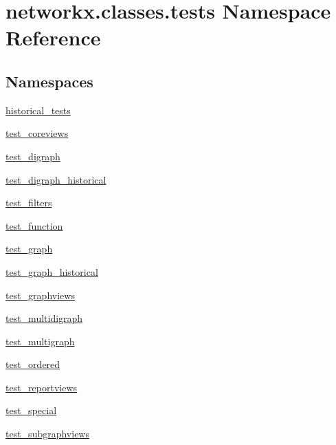 \hypertarget{namespacenetworkx_1_1classes_1_1tests}{}\section{networkx.\+classes.\+tests Namespace Reference}
\label{namespacenetworkx_1_1classes_1_1tests}
\subsection*{Namespaces}
\begin{DoxyCompactItemize}
\item 
 \hyperlink{namespacenetworkx_1_1classes_1_1tests_1_1historical__tests}{historical\+\_\+tests}
\item 
 \hyperlink{namespacenetworkx_1_1classes_1_1tests_1_1test__coreviews}{test\+\_\+coreviews}
\item 
 \hyperlink{namespacenetworkx_1_1classes_1_1tests_1_1test__digraph}{test\+\_\+digraph}
\item 
 \hyperlink{namespacenetworkx_1_1classes_1_1tests_1_1test__digraph__historical}{test\+\_\+digraph\+\_\+historical}
\item 
 \hyperlink{namespacenetworkx_1_1classes_1_1tests_1_1test__filters}{test\+\_\+filters}
\item 
 \hyperlink{namespacenetworkx_1_1classes_1_1tests_1_1test__function}{test\+\_\+function}
\item 
 \hyperlink{namespacenetworkx_1_1classes_1_1tests_1_1test__graph}{test\+\_\+graph}
\item 
 \hyperlink{namespacenetworkx_1_1classes_1_1tests_1_1test__graph__historical}{test\+\_\+graph\+\_\+historical}
\item 
 \hyperlink{namespacenetworkx_1_1classes_1_1tests_1_1test__graphviews}{test\+\_\+graphviews}
\item 
 \hyperlink{namespacenetworkx_1_1classes_1_1tests_1_1test__multidigraph}{test\+\_\+multidigraph}
\item 
 \hyperlink{namespacenetworkx_1_1classes_1_1tests_1_1test__multigraph}{test\+\_\+multigraph}
\item 
 \hyperlink{namespacenetworkx_1_1classes_1_1tests_1_1test__ordered}{test\+\_\+ordered}
\item 
 \hyperlink{namespacenetworkx_1_1classes_1_1tests_1_1test__reportviews}{test\+\_\+reportviews}
\item 
 \hyperlink{namespacenetworkx_1_1classes_1_1tests_1_1test__special}{test\+\_\+special}
\item 
 \hyperlink{namespacenetworkx_1_1classes_1_1tests_1_1test__subgraphviews}{test\+\_\+subgraphviews}
\end{DoxyCompactItemize}
